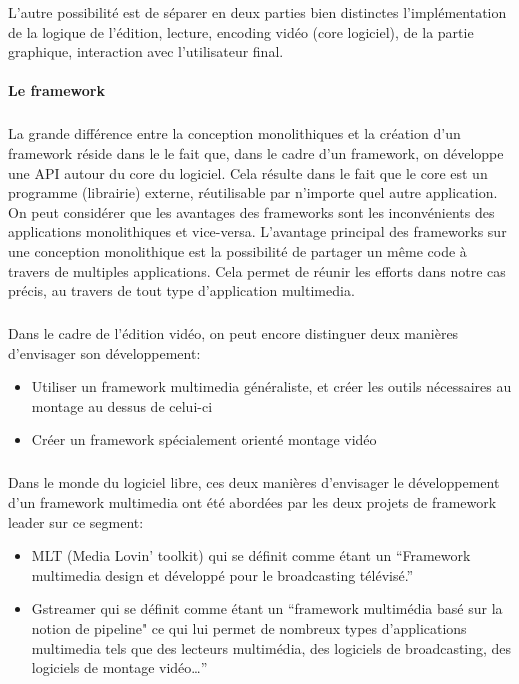 L'autre possibilité est de séparer en deux parties bien distinctes
l'implémentation de la logique de l'édition, lecture, encoding vidéo
(core logiciel), de la partie graphique, interaction avec l'utilisateur
final.

\paragraph {Le framework}

\subparagraph{}

La grande différence entre la conception monolithiques
 et la création d'un framework 
réside dans le le fait que, dans le cadre d'un framework, on développe
une API  autour du core du logiciel. Cela résulte dans le
fait que le core est un programme (librairie) externe, réutilisable par
n'importe quel autre application.  On peut considérer que les avantages
des frameworks sont les inconvénients des applications monolithiques
 et vice-versa. L'avantage principal des frameworks
sur une conception monolithique est la possibilité
de partager un même code à travers de multiples applications. Cela
permet de réunir les efforts dans notre cas précis, au travers de tout
type d'application multimedia.

\subparagraph{}

Dans le cadre de l'édition vidéo, on peut encore distinguer deux
manières d'envisager son développement:

\begin {itemize}

  \item {Utiliser un framework multimedia généraliste, et créer les
  outils nécessaires au montage au dessus de celui-ci}

  \item {Créer un framework spécialement orienté montage vidéo}

\end {itemize}

\subparagraph{}

Dans le monde du logiciel libre, ces deux manières d'envisager le
développement d'un framework multimedia ont été abordées par les
deux projets de framework leader sur ce segment:

\begin {itemize}

  \item {MLT (Media Lovin' toolkit) qui se définit comme
  étant un ``Framework multimedia design
    et développé pour le broadcasting télévisé.''}

  \item {Gstreamer qui se définit comme étant un ``framework multimédia
    basé sur la notion de pipeline" ce qui lui permet de nombreux types
    d'applications multimedia tels que des lecteurs multimédia, des
    logiciels de broadcasting, des logiciels de montage vidéo\ldots''}

\end {itemize}

